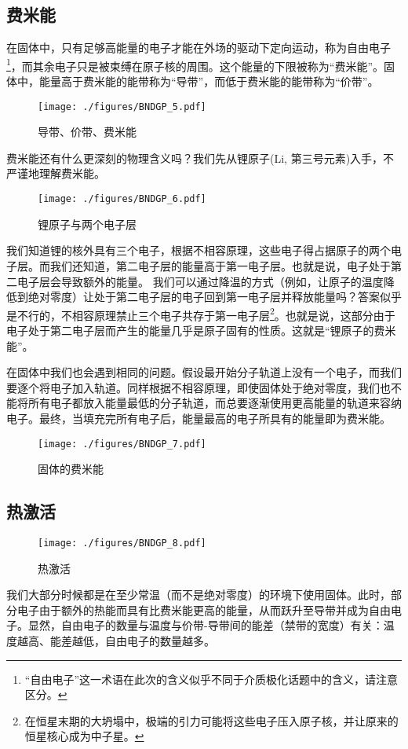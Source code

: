 \subsection{费米能}
在固体中，只有足够高能量的电子才能在外场的驱动下定向运动，称为自由电子\footnote{“自由电子”这一术语在此次的含义似乎不同于介质极化话题中的含义，请注意区分。}，而其余电子只是被束缚在原子核的周围。这个能量的下限被称为“费米能”。固体中，能量高于费米能的能带称为“导带”，而低于费米能的能带称为“价带”。
\begin{figure}[ht]
\centering
\texttt{[image: ./figures/BNDGP\_5.pdf]}
\caption{导带、价带、费米能} \label{BNDGP_fig5}
\end{figure}

费米能还有什么更深刻的物理含义吗？我们先从锂原子(Li, 第三号元素)入手，不严谨地理解费米能。
\begin{figure}[ht]
\centering
\texttt{[image: ./figures/BNDGP\_6.pdf]}
\caption{锂原子与两个电子层} \label{BNDGP_fig6}
\end{figure}
我们知道锂的核外具有三个电子，根据不相容原理，这些电子得占据原子的两个电子层。而我们还知道，第二电子层的能量高于第一电子层。也就是说，电子处于第二电子层会导致额外的能量。
我们可以通过降温的方式（例如，让原子的温度降低到绝对零度）让处于第二电子层的电子回到第一电子层并释放能量吗？答案似乎是不行的，不相容原理禁止三个电子共存于第一电子层\footnote{在恒星末期的大坍塌中，极端的引力可能将这些电子压入原子核，并让原来的恒星核心成为中子星。}。也就是说，这部分由于电子处于第二电子层而产生的能量几乎是原子固有的性质。这就是“锂原子的费米能”。

在固体中我们也会遇到相同的问题。假设最开始分子轨道上没有一个电子，而我们要逐个将电子加入轨道。同样根据不相容原理，即使固体处于绝对零度，我们也不能将所有电子都放入能量最低的分子轨道，而总要逐渐使用更高能量的轨道来容纳电子。最终，当填充完所有电子后，能量最高的电子所具有的能量即为费米能。
\begin{figure}[ht]
\centering
\texttt{[image: ./figures/BNDGP\_7.pdf]}
\caption{固体的费米能} \label{BNDGP_fig7}
\end{figure}

\subsection{热激活}
\begin{figure}[ht]
\centering
\texttt{[image: ./figures/BNDGP\_8.pdf]}
\caption{热激活} \label{BNDGP_fig8}
\end{figure}
我们大部分时候都是在至少常温（而不是绝对零度）的环境下使用固体。此时，部分电子由于额外的热能而具有比费米能更高的能量，从而跃升至导带并成为自由电子。显然，自由电子的数量与温度与价带-导带间的能差（禁带的宽度）有关：温度越高、能差越低，自由电子的数量越多。

